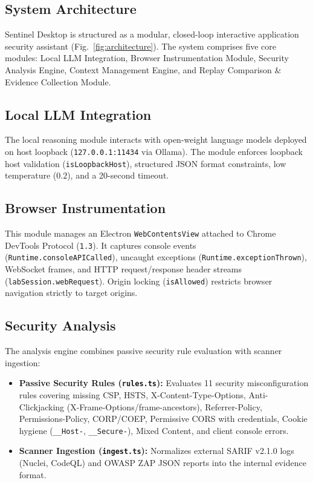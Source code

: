 \documentclass[conference]{IEEEtran}
\begin{document}
\subsection{System Architecture}
Sentinel Desktop is structured as a modular, closed-loop interactive application security assistant (Fig.~\ref{fig:architecture}). The system comprises five core modules: Local LLM Integration, Browser Instrumentation Module, Security Analysis Engine, Context Management Engine, and Replay Comparison \& Evidence Collection Module.

\subsection{Local LLM Integration}
The local reasoning module interacts with open-weight language models deployed on host loopback (\texttt{127.0.0.1:11434} via Ollama). The module enforces loopback host validation (\texttt{isLoopbackHost}), structured JSON format constraints, low temperature ($0.2$), and a 20-second timeout.

\subsection{Browser Instrumentation}
This module manages an Electron \texttt{WebContentsView} attached to Chrome DevTools Protocol (\texttt{1.3}). It captures console events (\texttt{Runtime.consoleAPICalled}), uncaught exceptions (\texttt{Runtime.exceptionThrown}), WebSocket frames, and HTTP request/response header streams (\texttt{labSession.webRequest}). Origin locking (\texttt{isAllowed}) restricts browser navigation strictly to target origins.

\subsection{Security Analysis}
The analysis engine combines passive security rule evaluation with scanner ingestion:
\begin{itemize}
    \item \textbf{Passive Security Rules (\texttt{rules.ts}):} Evaluates 11 security misconfiguration rules covering missing CSP, HSTS, X-Content-Type-Options, Anti-Clickjacking (X-Frame-Options/frame-ancestors), Referrer-Policy, Permissions-Policy, CORP/COEP, Permissive CORS with credentials, Cookie hygiene (\texttt{\_\_Host-}, \texttt{\_\_Secure-}), Mixed Content, and client console errors.
    \item \textbf{Scanner Ingestion (\texttt{ingest.ts}):} Normalizes external SARIF v2.1.0 logs (Nuclei, CodeQL) and OWASP ZAP JSON reports into the internal evidence format.
\end{itemize}
\end{document}
